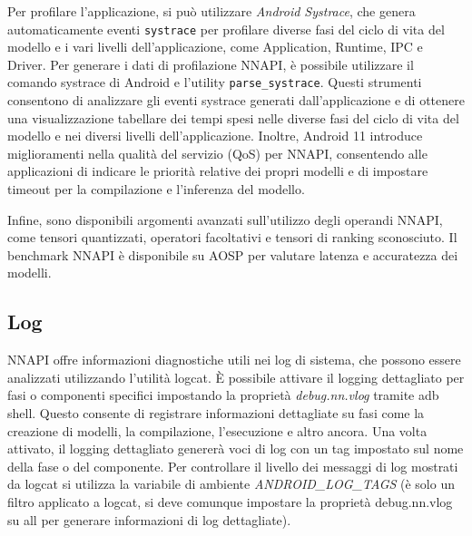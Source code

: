 Per profilare l'applicazione, si può utilizzare \textit{Android Systrace}, che genera automaticamente eventi \texttt{systrace} per profilare diverse fasi del ciclo di vita del modello e i vari livelli dell'applicazione, come Application,
Runtime, IPC e Driver.
Per generare i dati di profilazione NNAPI, è possibile utilizzare il comando systrace di Android e l'utility \texttt{parse\_systrace}. Questi strumenti consentono di analizzare gli eventi systrace generati dall'applicazione e di ottenere
una visualizzazione tabellare dei tempi spesi nelle diverse fasi del ciclo di vita del modello e nei diversi livelli dell'applicazione.
Inoltre, Android 11 introduce miglioramenti nella qualità del servizio (QoS) per NNAPI, consentendo alle applicazioni di indicare le priorità relative dei propri modelli e di impostare timeout per la compilazione e l'inferenza del modello.

Infine, sono disponibili argomenti avanzati sull'utilizzo degli operandi NNAPI, come tensori quantizzati, operatori facoltativi e tensori di ranking sconosciuto. Il benchmark NNAPI è disponibile su AOSP per valutare latenza e accuratezza
dei modelli.

\subsection{Log}
NNAPI offre informazioni diagnostiche utili nei log di sistema, che possono essere analizzati utilizzando l'utilità logcat. È possibile attivare il logging dettagliato per fasi o componenti specifici impostando la proprietà
\textit{debug.nn.vlog} tramite adb shell. Questo consente di registrare informazioni dettagliate su fasi come la creazione di modelli, la compilazione, l'esecuzione e altro ancora.
Una volta attivato, il logging dettagliato genererà voci di log con un tag impostato sul nome della fase o del componente. Per controllare il livello dei messaggi di log mostrati da logcat si utilizza
la variabile di ambiente \textit{ANDROID\_LOG\_TAGS} (è solo un filtro applicato a logcat, si deve comunque impostare la proprietà debug.nn.vlog su all per generare informazioni di log dettagliate).

